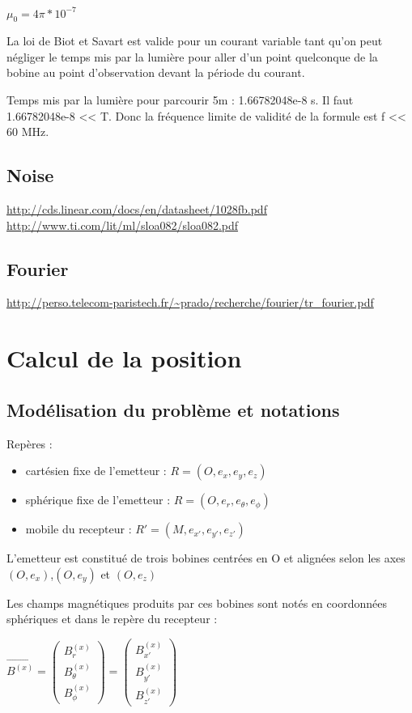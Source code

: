 \documentclass[a4paper,11pt]{article}
\begin{document}
$ \mu_0 = 4\pi*10^{-7} $

La loi de Biot et Savart est valide pour un courant variable tant qu'on peut négliger le temps mis par la lumière pour aller d'un point quelconque de la bobine au point d'observation devant la période du courant.

Temps mis par la lumière pour parcourir 5m : 1.66782048e-8 s.
Il faut 1.66782048e-8 << T.
Donc la fréquence limite de validité de la formule est f << 60 MHz.

\subsection{Noise}

\url{http://cds.linear.com/docs/en/datasheet/1028fb.pdf}
\url{http://www.ti.com/lit/ml/sloa082/sloa082.pdf}

\subsection{Fourier}

\url{http://perso.telecom-paristech.fr/~prado/recherche/fourier/tr_fourier.pdf}

\section{Calcul de la position}

\subsection{Modélisation du problème et notations}

Repères :
\begin{itemize}
\item cartésien fixe de l'emetteur : $R = (O,e_x,e_y,e_z)$
\item sphérique fixe de l'emetteur : $R = (O,e_r,e_\theta,e_\phi)$
\item mobile du recepteur : $R' = (M,e_{x'},e_{y'},e_{z'})$
\end{itemize}

L'emetteur est constitué de trois bobines centrées en O et alignées selon les axes $(O,e_x)$,$(O,e_y)$ et $(O,e_z)$

Les champs magnétiques produits par ces bobines sont notés en coordonnées sphériques et dans le repère du recepteur :

$\vec{B^{(x)}}
=
\left(
  \begin{array}{ c }
    B^{(x)}_{r} \\
    B^{(x)}_{\theta} \\
    B^{(x)}_{\phi}
  \end{array} \right)
=
\left(
  \begin{array}{ c }
    B^{(x)}_{x'} \\
    B^{(x)}_{y'} \\
    B^{(x)}_{z'}
  \end{array} \right)$
\end{document}
